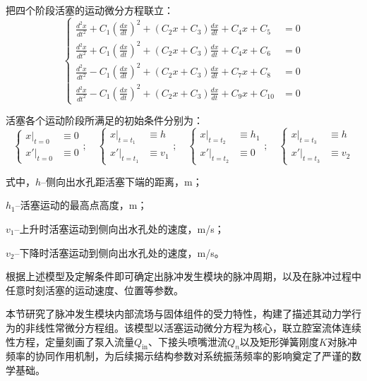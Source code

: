 把四个阶段活塞的运动微分方程联立：
\begin{equation}
\left\{
\begin{aligned}
\frac{d^2 x}{dt^2} + C_1 \left(\frac{dx}{dt}\right)^2 + (C_2 x + C_3)\frac{dx}{dt} + C_4 x + C_5 &= 0 \\
\frac{d^2 x}{dt^2} + C_1 \left(\frac{dx}{dt}\right)^2 + (C_2 x + C_3)\frac{dx}{dt} + C_4 x + C_6 &= 0 \\
\frac{d^2 x}{dt^2} - C_1 \left(\frac{dx}{dt}\right)^2 + (C_2 x + C_3)\frac{dx}{dt} + C_7 x + C_8 &= 0 \\
\frac{d^2 x}{dt^2} - C_1 \left(\frac{dx}{dt}\right)^2 + (C_2 x + C_3)\frac{dx}{dt} + C_9 x + C_{10} &= 0
\end{aligned}
\right.
\end{equation}


活塞各个运动阶段所满足的初始条件分别为：
\begin{equation}
\left\{
\begin{aligned}
x\big|_{t=0} &\equiv 0 \\
x'\big|_{t=0} &\equiv 0
\end{aligned}
\right.
;\quad
\left\{
\begin{aligned}
x\big|_{t=t_1} &\equiv h \\
x'\big|_{t=t_1} &\equiv v_1
\end{aligned}
\right.
;\quad
\left\{
\begin{aligned}
x\big|_{t=t_2} &\equiv h_1 \\
x'\big|_{t=t_2} &\equiv 0
\end{aligned}
\right.
;\quad
\left\{
\begin{aligned}
x\big|_{t=t_3} &\equiv h \\
x'\big|_{t=t_3} &\equiv v_2
\end{aligned}
\right.
\end{equation}

式中，$h$--侧向出水孔距活塞下端的距离，m；

$h_1$--活塞运动的最高点高度，m；

$v_1$--上升时活塞运动到侧向出水孔处的速度，m/s；

$v_2$--下降时活塞运动到侧向出水孔处的速度，m/s。

根据上述模型及定解条件即可确定出脉冲发生模块的脉冲周期，以及在脉冲过程中任意时刻活塞的运动速度、位置等参数\cite{ref27,ref28}。

本节研究了脉冲发生模块内部流场与固体组件的受力特性，构建了描述其动力学行为的非线性常微分方程组。该模型以活塞运动微分方程为核心，联立腔室流体连续性方程，定量刻画了泵入流量$Q_{\mathrm{in}}$、下接头喷嘴泄流$Q_n$以及矩形弹簧刚度$K$对脉冲频率的协同作用机制，为后续揭示结构参数对系统振荡频率的影响奠定了严谨的数学基础。

